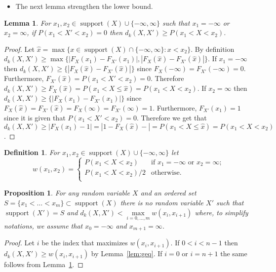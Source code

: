 \documentclass{article}
\newtheorem{lemma}[thm]{Lemma}
\newtheorem{definition}[thm]{Definition}
\newtheorem{proposition}[thm]{Proposition}
\DeclareMathOperator{\support}{support}
\begin{document}
\begin{itemize}
	\item The next lemma strengthen the lower bound.
\end{itemize}


\begin{lemma}\label{lem:geq2}
	For $x_1, x_2 \in \support(X) \cup \{-\infty,\infty\}$ such that $x_1=-\infty$ or  $x_2=\infty$, if $P(x_1 < X' < x_2)=0$  then 
	$d_k(X,X') \geq P(x_1 < X < x_2)$.
\end{lemma}
\begin{proof}
	Let $\hat x=\max \{x \in \support(X) \cap\{ -\infty, \infty\}  \colon x < x_2 \}$. By definition $d_k(X,X') \geq \max \{|F_X(x_1) - F_{X'}(x_1)|, |F_X(\hat x) - F_{X'}(\hat x)| \}$. If $x_1=-\infty$ then $d_k(X,X') \geq \{|F_X(\hat x) - F_{X'}(\hat x)| \}$ since $F_X(-\infty) = F_{X'}(-\infty) = 0$. Furthermore, $F_{X'}(\hat x) = P(x_1 < X' < x_2)=0$. Therefore $d_k(X,X') \geq F_X(\hat x) = P(x_1 < X \leq \hat x) = P(x_1 < X < x_2)$. 
	If $x_2=\infty$ then $d_k(X,X') \geq \{|F_X(x_1) - F_{X'}(x_1)| \}$ since $F_X(\hat{x}) = F_{X'}(\hat{x}) = F_X(\infty) = F_{X'}(\infty) = 1$. Furthermore, $F_{X'}(x_1) = 1$ since it is given that $P(x_1 < X' < x_2)=0$. Therefore we get that $d_k(X,X') \geq |F_X(x_1)-1| = |1-F_X(\hat x)-| = P(x_1 < X \leq \hat x) = P(x_1 < X < x_2)$.
\end{proof}


\begin{definition} For $x_1,x_2 \in \support(X) \cup \{-\infty,\infty\}$ let
	\[
	w(x_1,x_2)=
	\begin{cases}
		P(x_1 < X < x_2) & \text{if $x_1=-\infty$ or $x_2 = \infty$;} \\
		P(x_1 < X < x_2)/2 & \text{otherwise.} \\	
	\end{cases}
	\]
\end{definition} 


\begin{proposition}
	For any random variable $X$ and an ordered set $S=\{x_1<\dots<x_m\} \subset \support(X)$ there is no random variable $X'$ such that $\support(X')=S$ and $d_k(X,X') < \max\limits_{i=0,\dots,m} w(x_{i}, x_{i+1})$ where, to simplify notations, we assume that $x_0=-\infty$ and $x_{m+1}=\infty$.
\end{proposition}

\begin{proof}
	Let $i$ be the index that maximizes $w(x_{i}, x_{i+1})$. If $0<i<n-1$ then $d_k(X,X') \geq w(x_{i}, x_{i+1})$ by Lemma~\ref{lem:geq}. If $i=0$ or $i=n+1$ the same follows from Lemma~\ref{lem:geq2}.
\end{proof}
\end{document}
